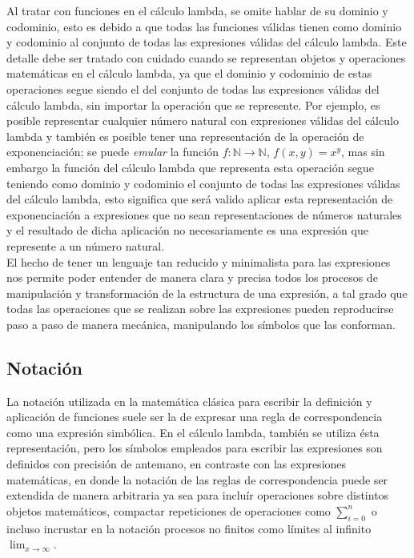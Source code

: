 Al tratar con funciones en el cálculo lambda, se omite hablar de su dominio y
codominio, esto es debido a que todas las funciones válidas tienen como dominio 
y codominio al conjunto de todas las expresiones válidas del cálculo lambda. 
Este detalle debe ser tratado con cuidado cuando se representan objetos y 
operaciones matemáticas en el cálculo lambda, ya que el dominio y codominio de 
estas operaciones segue siendo el del conjunto de todas las expresiones 
válidas del cálculo lambda, sin importar la operación que se represente. Por 
ejemplo, es posible representar cualquier número natural con expresiones válidas 
del cálculo lambda y también es posible tener una representación de la operación 
de exponenciación; se puede \emph{emular} la función \(f : \mathbb{N} \to
\mathbb{N}\), \(f(x,y)=x^y\), mas sin embargo la función del cálculo lambda que
representa esta operación segue teniendo como dominio y codominio el conjunto
de todas las expresiones válidas del cálculo lambda, esto significa que será
valido aplicar esta representación de exponenciación a expresiones que no sean
representaciones de números naturales y el resultado de dicha aplicación no
necesariamente es una expresión que represente a un número natural.\\

El hecho de tener un lenguaje tan reducido y minimalista para las expresiones
nos permite poder entender de manera clara y precisa todos los procesos de
manipulación y transformación de la estructura de una expresión, a tal grado que
todas las operaciones que se realizan sobre las expresiones pueden reproducirse
paso a paso de manera mecánica, manipulando los símbolos que las conforman.\\

\subsection{Notación} \label{sec:1.1.1}

La notación utilizada en la matemática clásica para escribir la definición y
aplicación de funciones suele ser la de expresar una regla de correspondencia
como una expresión simbólica. En el cálculo lambda, también se utiliza ésta
representación, pero los símbolos empleados para escribir las expresiones son
definidos con precisión de antemano, en contraste con las expresiones
matemáticas, en donde la notación de las reglas de correspondencia puede ser
extendida de manera arbitraria ya sea para incluír operaciones sobre distintos
objetos matemáticos, compactar repeticiones de operaciones como
\(\sum_{i=0}^n\) o incluso incrustar en la notación procesos no finitos como 
límites al infinito \(\lim_{x\to \infty}\).\\

